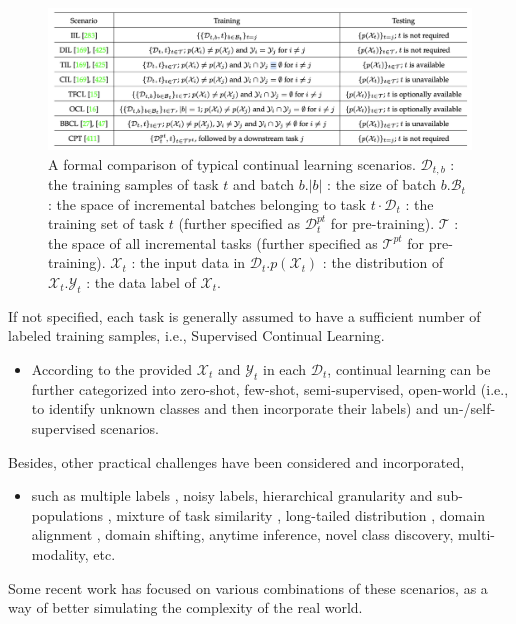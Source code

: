 \documentclass[9pt,dvipsnames]{beamer}
\begin{document}
\begin{frame}
    \begin{figure}[ht]
        \centering
        \includegraphics[width=\linewidth]{imgs/cl_2.png}
        \caption{A formal comparison of typical continual learning scenarios. $\mathcal{D}_{t, b}$ : the training samples of task $t$ and batch $b .|b|$ : the size of batch $b . \mathcal{B}_{t}$ : the space of incremental batches belonging to task $t \cdot \mathcal{D}_{t}$ : the training set of task $t$ (further specified as $\mathcal{D}_{t}^{p t}$ for pre-training). $\mathcal{T}$ : the space of all incremental tasks (further specified as $\mathcal{T}^{p t}$ for pre-training). $\mathcal{X}_{t}$ : the input data in $\mathcal{D}_{t} . p\left(\mathcal{X}_{t}\right)$ : the distribution of $\mathcal{X}_{t} . \mathcal{Y}_{t}$ : the data label of $\mathcal{X}_{t}$.}
    \end{figure}
\end{frame}
\begin{frame}
    If not specified, each task is generally assumed to have a sufficient number of labeled training samples, i.e., Supervised Continual Learning.
    \begin{itemize}
        \item According to the provided $\mathcal{X}_{t}$ and $\mathcal{Y}_{t}$ in each $\mathcal{D}_{t}$, continual learning can be further categorized into zero-shot, few-shot, semi-supervised, open-world (i.e., to identify unknown classes and then incorporate their labels)  and un-/self-supervised scenarios.
    \end{itemize}
    Besides, other practical challenges have been considered and incorporated,
    \begin{itemize}
        \item such as multiple labels , noisy labels, hierarchical granularity and sub-populations , mixture of task similarity , long-tailed distribution , domain alignment , domain shifting, anytime inference, novel class discovery, multi-modality, etc.
    \end{itemize}
    Some recent work has focused on various combinations of these scenarios, as a way of better simulating the complexity of the real world.
\end{frame}
\end{document}
